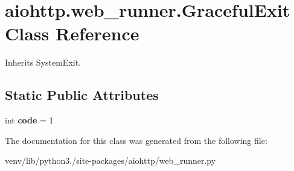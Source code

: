 \hypertarget{classaiohttp_1_1web__runner_1_1_graceful_exit}{}\section{aiohttp.\+web\+\_\+runner.\+Graceful\+Exit Class Reference}
\label{classaiohttp_1_1web__runner_1_1_graceful_exit}


Inherits System\+Exit.

\subsection*{Static Public Attributes}
\begin{DoxyCompactItemize}
\item 
\mbox{\label{classaiohttp_1_1web__runner_1_1_graceful_exit_aee304db2c2110f67be356158d26d54b6}} 
int {\bfseries code} = 1
\end{DoxyCompactItemize}


The documentation for this class was generated from the following file\+:\begin{DoxyCompactItemize}
\item 
venv/lib/python3./site-\/packages/aiohttp/web\+\_\+runner.\+py\end{DoxyCompactItemize}
